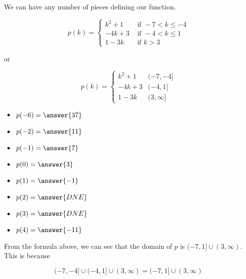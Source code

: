\documentclass{ximera}
\begin{document}
We can have any number of pieces defining our function.

\begin{question}

\[
p(k) = 
\begin{cases}
  k^2 + 1 & \text{ if } -7 < k \leq -4 \\
  -4k + 3 & \text{ if } -4 < k \leq 1 \\
  1 - 3k & \text{ if } k > 3
\end{cases}
\]


or


\[
p(k) = 
\begin{cases}
  k^2 + 1 & (-7, -4] \\
  -4k + 3 & (-4, 1] \\
  1 - 3k & (3, \infty]
\end{cases}
\]



\begin{itemize}
\item $p(-6) = \answer{37}$  
\item $p(-2) = \answer{11}$ 
\item $p(-1) = \answer{7}$ 
\item $p(0) = \answer{3}$ 
\item $p(1) = \answer{-1}$ 
\item $p(2) = \answer{DNE}$ 
\item $p(3) = \answer{DNE}$ 
\item $p(4) = \answer{-11}$ 
\end{itemize}

\end{question}



From the formula above, we can see that the domain of $p$ is $(-7, 1] \cup (3, \infty)$. \\

This is because


\[
(-7, -4] \cup (-4, 1] \cup (3, \infty) = (-7, 1] \cup (3, \infty)
\]
\end{document}
